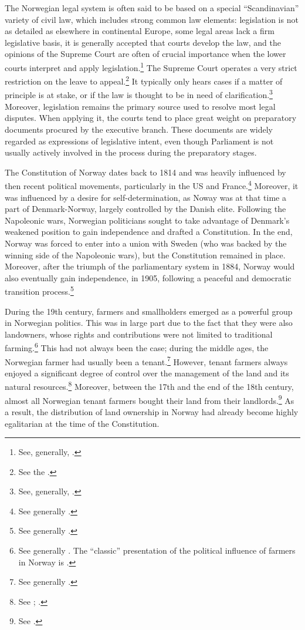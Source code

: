 The Norwegian legal system is often said to be based on a special ``Scandinavian'' variety of civil law, which includes strong common law elements: legislation is not as detailed as elsewhere in continental Europe, some legal areas lack a firm legislative basis, it is generally accepted that courts develop the law, and the opinions of the Supreme Court are often of crucial importance when the lower courts interpret and apply legislation.\footnote{See, generally, \cite{bernitz07}.} The Supreme Court operates a very strict restriction on the leave to appeal.\footnote{See the \dni\cite[30-4]{cda05}.} It typically only hears cases if a matter of principle is at stake, or if the law is thought to be in need of clarification.\footnote{See, generally, \cite{skoghoy08}.} Moreover, legislation remains the primary source used to resolve most legal disputes. When applying it, the courts tend to place great weight on preparatory documents procured by the executive branch. These documents are widely regarded as expressions of legislative intent, even though Parliament is not usually actively involved in the process during the preparatory stages.

The Constitution of Norway dates back to 1814 and was heavily influenced by then recent political movements, particularly in the US and France.\footnote{See generally \cite{mestad14}.} Moreover, it was influenced by a desire for self-determination, as Noway was at that time a part of Denmark-Norway, largely controlled by the Danish elite. Following the Napoleonic wars, Norwegian politicians sought to take advantage of Denmark's weakened position to gain independence and drafted a Constitution. In the end, Norway was forced to enter into a union with Sweden (who was backed by the winning side of the Napoleonic wars), but the Constitution remained in place. Moreover, after the triumph of the parliamentary system in 1884, Norway would also eventually gain independence, in 1905, following a peaceful and democratic transition process.\footnote{See generally \cite{sejersted15}.}

During the 19th century, farmers and smallholders emerged as a powerful group in Norwegian politics. This was in large part due to the fact that they were also landowners, whose rights and contributions were not limited to traditional farming.\footnote{See generally \cite{hommerstad14}. The ``classic'' presentation of the political influence of farmers in Norway is \cite{koht26}.} This had not always been the case; during the middle ages, the Norwegian farmer had usually been a tenant.\footnote{See generally \cite{myking05}.} However, tenant farmers always enjoyed a significant degree of control over the management of the land and its natural resources.\footnote{See \cite[59-60]{pryser99}; \cite[226-238]{myking05}.} Moreover, between the 17th and the end of the 18th century, almost all Norwegian tenant farmers bought their land from their landlords.\footnote{See \cite[108]{nordtveit15}.} 
As a result, the distribution of land ownership in Norway had already become highly egalitarian at the time of the Constitution.


